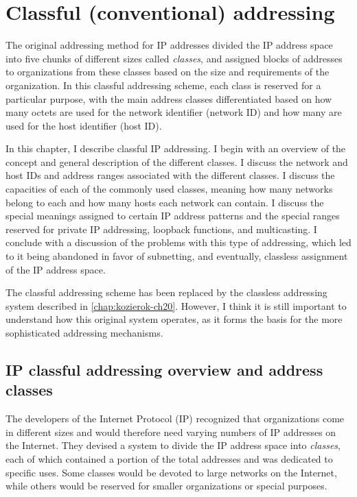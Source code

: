 \chapter{Classful (conventional) addressing}
\label{chap:kozierok-ch17}

The original addressing method for IP addresses divided the IP address
space into five chunks of different sizes called {\emph{classes}}, and
assigned blocks of addresses to organizations from these classes based
on the size and requirements of the organization. In this classful
addressing scheme, each class is reserved for a particular purpose, with
the main address classes differentiated based on how many octets are
used for the network identifier (network ID) and how many are used for
the host identifier (host ID).

In this chapter, I describe classful IP addressing. I begin with an
overview of the concept and general description of the different
classes. I discuss the network and host IDs and address ranges
associated with the different classes. I discuss the capacities of each
of the commonly used classes, meaning how many networks belong to each
and how many hosts each network can contain. I discuss the special
meanings assigned to certain IP address patterns and the special ranges reserved for private IP addressing, loopback functions, and multicasting.
I conclude with a discussion of the problems with this
type of addressing, which led to it being abandoned in favor of subnetting, and eventually, classless assignment of the IP address space.

\begin{note}
The classful addressing scheme has been replaced by the classless addressing system described in \vref{chap:kozierok-ch20}.
However, I think it is still important to understand how this original system operates, as it forms the basis for the more sophisticated addressing mechanisms.
\end{note}


\section{IP classful addressing overview and address classes}

The developers of the Internet Protocol (IP) recognized that organizations come in different sizes and would therefore need varying
numbers of IP addresses on the Internet.
They devised a system to divide the IP address space into {\emph{classes}}, each of which contained a portion of the total addresses and was dedicated to specific uses.
Some classes would be devoted to large networks on the Internet, while others would be reserved for smaller organizations or special purposes.

